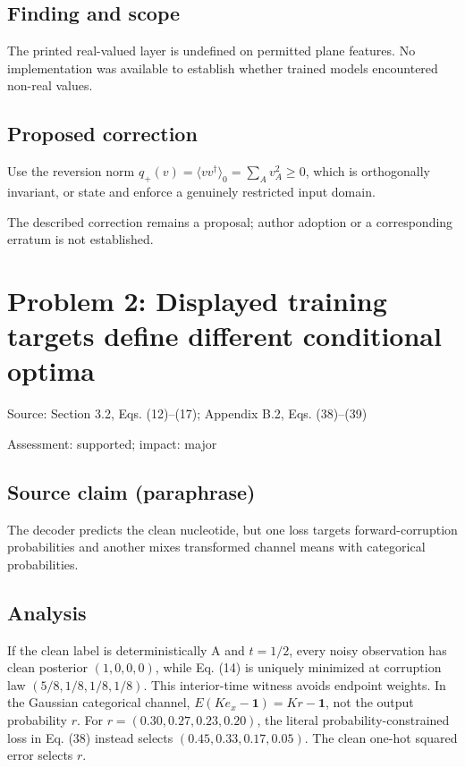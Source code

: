\documentclass[11pt]{article}
\begin{document}
\subsection*{Finding and scope}

The printed real-valued layer is undefined on permitted plane features. No implementation was available to establish whether trained models encountered non-real values.

\subsection*{Proposed correction}

Use the reversion norm \(q_+(v)=\langle vv^\dagger\rangle_0=\sum_Av_A^2\ge0\), which is orthogonally invariant, or state and enforce a genuinely restricted input domain.

The described correction remains a proposal; author adoption or a corresponding erratum is not established.

\section*{Problem 2: Displayed training targets define different conditional optima}

Source: Section 3.2, Eqs. (12)–(17); Appendix B.2, Eqs. (38)–(39)

Assessment: supported; impact: major

\subsection*{Source claim (paraphrase)}

The decoder predicts the clean nucleotide, but one loss targets forward-corruption probabilities and another mixes transformed channel means with categorical probabilities.

\subsection*{Analysis}

If the clean label is deterministically A and \(t=1/2\), every noisy observation has clean posterior \((1,0,0,0)\), while Eq. (14) is uniquely minimized at corruption law \((5/8,1/8,1/8,1/8)\). This interior-time witness avoids endpoint weights. In the Gaussian categorical channel, \(E(Ke_x-\mathbf1)=Kr-\mathbf1\), not the output probability \(r\). For \(r=(0.30,0.27,0.23,0.20)\), the literal probability-constrained loss in Eq. (38) instead selects \((0.45,0.33,0.17,0.05)\). The clean one-hot squared error selects \(r\).
\end{document}

